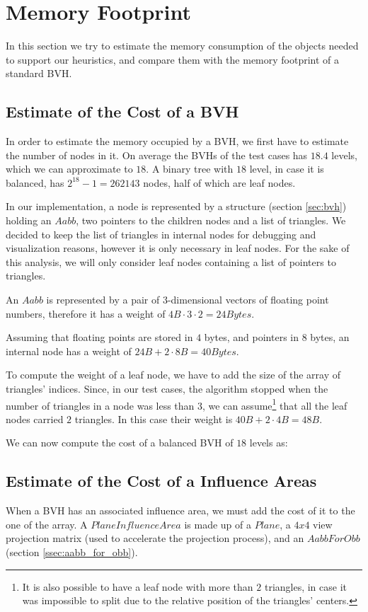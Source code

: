 \documentclass{PoliMi_MasterThesis}
\begin{document}
\section{Memory Footprint} \label{sec:memory_footprint}
In this section we try to estimate the memory consumption of the objects needed to support our heuristics, and compare them with the memory footprint of a standard BVH.

\subsection*{Estimate of the Cost of a BVH}
In order to estimate the memory occupied by a BVH, we first have to estimate the number of nodes in it. On average the BVHs of the test cases has $18.4$ levels, which we can approximate to $18$. A binary tree with $18$ level, in case it is balanced, has $2^{18}-1 = 262143$ nodes, half of which are leaf nodes.

In our implementation, a node is represented by a structure (section \ref{sec:bvh}) holding an $Aabb$, two pointers to the children nodes and a list of triangles. We decided to keep the list of triangles in internal nodes for debugging and visualization reasons, however it is only necessary in leaf nodes. For the sake of this analysis, we will only consider leaf nodes containing a list of pointers to triangles. 

An $Aabb$ is represented by a pair of 3-dimensional vectors of floating point numbers, therefore it has a weight of $4B \cdot 3 \cdot 2 = 24 Bytes$.

Assuming that floating points are stored in $4$ bytes, and pointers in $8$ bytes, an internal node has a weight of $24B + 2 \cdot 8B = 40 Bytes$. 

To compute the weight of a leaf node, we have to add the size of the array of triangles' indices. Since, in our test cases, the algorithm stopped when the number of triangles in a node was less than 3, we can assume\footnote{It is also possible to have a leaf node with more than $2$ triangles, in case it was impossible to split due to the relative position of the triangles' centers.} that all the leaf nodes carried $2$ triangles. In this case their weight is $40B + 2 \cdot 4B = 48B$.

We can now compute the cost of a balanced BVH of $18$ levels as:
\unboldmath

\subsection*{Estimate of the Cost of a Influence Areas}
When a BVH has an associated influence area, we must add the cost of it to the one of the array. A $PlaneInfluenceArea$ is made up of a $Plane$, a $4x4$ view projection matrix (used to accelerate the projection process), and an $AabbForObb$ (section \ref{ssec:aabb_for_obb}).
\end{document}
